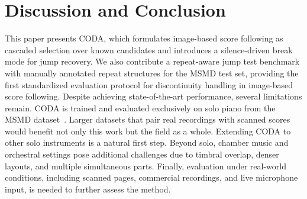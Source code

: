 \documentclass{article}
\begin{document}
\section{Discussion and Conclusion}\label{sec:conclusion}
This paper presents CODA, which formulates image-based score following as
cascaded selection over known candidates and introduces a silence-driven
break mode for jump recovery. We also contribute a repeat-aware jump test benchmark with manually annotated repeat structures for the MSMD test set, providing the first standardized evaluation protocol for discontinuity handling in image-based score following. Despite achieving state-of-the-art performance, several limitations remain. CODA is trained and evaluated exclusively on solo piano from the MSMD dataset~\cite{dorfer2018learning}. Larger datasets that pair real recordings with scanned scores would benefit not only this work but the field as a whole. Extending CODA to other solo instruments is a natural first step. Beyond solo, chamber music and orchestral settings pose additional challenges due to timbral overlap, denser layouts, and multiple simultaneous parts. Finally, evaluation under real-world conditions, including scanned pages, commercial recordings, and live microphone input, is needed to further assess the method.


\end{document}
